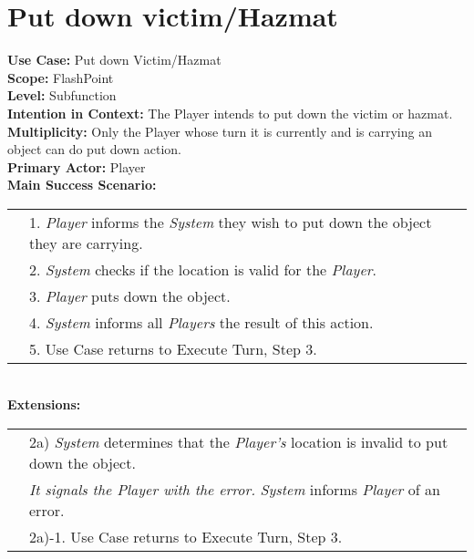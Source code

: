 \documentclass{article}
\begin{document}
	\section*{Put down victim/Hazmat}
	\textbf{Use Case:} Put down Victim/Hazmat\\
	\textbf{Scope:} FlashPoint\\
	\textbf{Level:} Subfunction\\
	\textbf{Intention in Context:} The Player intends to put down the victim or hazmat.\\
	\textbf{Multiplicity:} Only the Player whose turn it is currently and is carrying an object can do put down action.\\
	\textbf{Primary Actor:} Player\\
	\textbf{Main Success Scenario:}\\
	\begin{tabular}{l l}
		&1. \textit{Player} informs the \textit{System} they wish to put down the object they are carrying.\\
		&2. \textit{System} checks if the location is valid for the \textit{Player}.\\
		&3. \textit{Player} puts down the object.\\
		&4. \textit{System} informs all \textit{Players} the result of this action.\\
		&5. Use Case returns to Execute Turn, Step 3.
	\end{tabular}\\
	\textbf{Extensions:}\\
	\begin{tabular}{l l}
		&2a) \textit{System} determines that the \textit{Player’s} location is invalid to put down the object.\\
		&\qquad\textit{It signals the Player with the error.} \textit{System} informs \textit{Player} of an error.\\
		&\qquad2a)-1. Use Case returns to Execute Turn, Step 3.
	\end{tabular}
\end{document}
